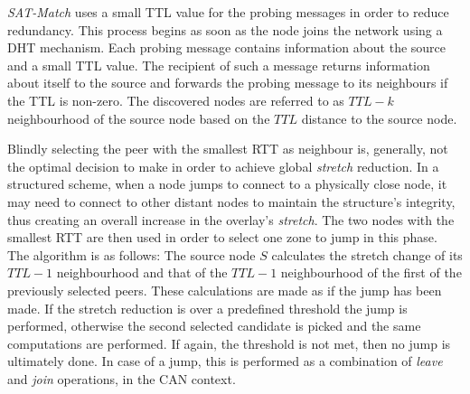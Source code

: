 \emph{SAT-Match} uses a small TTL value for the probing messages in order to
reduce redundancy\cite{jiang_lightflood_2008}. This process begins as soon as
the node joins the network using a DHT mechanism. Each probing message contains
information about the source and a small TTL value. The recipient of such a
message returns information about itself to the source and forwards the probing
message to its neighbours if the TTL is non-zero. The discovered nodes are
referred to as $TTL-k$ neighbourhood of the source node based on the $TTL$
distance to the source node.

Blindly selecting the peer with the smallest RTT as neighbour is, generally, not
the optimal decision to make in order to achieve global \emph{stretch} reduction.
In a structured scheme, when a node jumps to connect to a physically close node,
it may need to connect to other distant nodes to maintain the structure's
integrity, thus creating an overall increase in the overlay's \emph{stretch}.
The two nodes with the smallest RTT are then used in order to select one zone to
jump in this phase. The algorithm is as follows: The source node $S$ calculates
the stretch change of its $TTL-1$ neighbourhood and that of the $TTL-1$
neighbourhood of the first of the previously selected peers. These calculations
are made as if the jump has been made. If the stretch reduction is over a
predefined threshold the jump is performed, otherwise the second selected
candidate is picked and the same computations are performed. If again, the
threshold is not met, then no jump is ultimately done. In case of a jump, this
is performed as a combination of \emph{leave} and \emph{join} operations, in the
CAN context.

